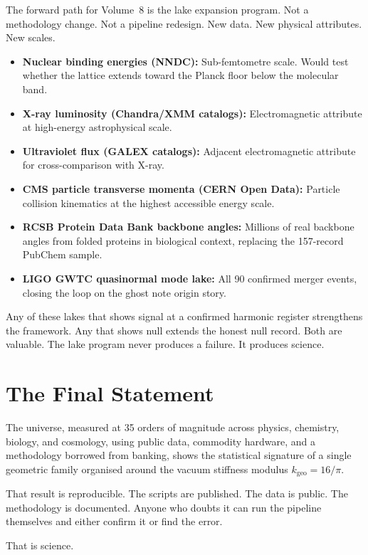 \documentclass[11pt, letterpaper, openany]{book}
\begin{document}
The forward path for Volume~8 is the lake expansion program. Not a methodology change.
Not a pipeline redesign. New data. New physical attributes. New scales.

\begin{itemize}
\item \textbf{Nuclear binding energies (NNDC):} Sub-femtometre scale. Would test
whether the lattice extends toward the Planck floor below the molecular band.
\item \textbf{X-ray luminosity (Chandra/XMM catalogs):} Electromagnetic attribute
at high-energy astrophysical scale.
\item \textbf{Ultraviolet flux (GALEX catalogs):} Adjacent electromagnetic attribute
for cross-comparison with X-ray.
\item \textbf{CMS particle transverse momenta (CERN Open Data):} Particle collision
kinematics at the highest accessible energy scale.
\item \textbf{RCSB Protein Data Bank backbone angles:} Millions of real backbone angles
from folded proteins in biological context, replacing the 157-record PubChem sample.
\item \textbf{LIGO GWTC quasinormal mode lake:} All 90 confirmed merger events, closing
the loop on the ghost note origin story.
\end{itemize}

Any of these lakes that shows signal at a confirmed harmonic register strengthens
the framework. Any that shows null extends the honest null record. Both are valuable.
The lake program never produces a failure. It produces science.

\section*{The Final Statement}

The universe, measured at 35 orders of magnitude across physics, chemistry, biology,
and cosmology, using public data, commodity hardware, and a methodology borrowed from
banking, shows the statistical signature of a single geometric family organised around
the vacuum stiffness modulus $k_\text{geo} = 16/\pi$.

That result is reproducible. The scripts are published. The data is public. The
methodology is documented. Anyone who doubts it can run the pipeline themselves and
either confirm it or find the error.

That is science.
\end{document}

